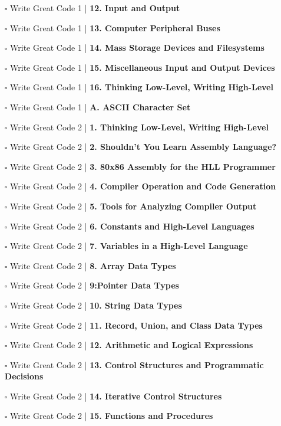 \documentclass[a4, landscape, 12pt]{article}
\newcommand{\checkbox}{$\square$}%
\begin{document}
\begin{itemize}
{}
\item [\checkbox]  Write Great Code 1 | \textbf{ 12. Input and Output
}
\item [\checkbox]  Write Great Code 1 | \textbf{ 13. Computer Peripheral Buses
}
\item [\checkbox]  Write Great Code 1 | \textbf{ 14. Mass Storage Devices and Filesystems
}
\item [\checkbox]  Write Great Code 1 | \textbf{ 15. Miscellaneous Input and Output Devices
}
\item [\checkbox]  Write Great Code 1 | \textbf{ 16. Thinking Low-Level, Writing High-Level
}
\item [\checkbox]  Write Great Code 1 | \textbf{ A. ASCII Character Set
}
\item [\checkbox]  Write Great Code 2 | \textbf{ 1. Thinking Low-Level, Writing High-Level
}
\item [\checkbox]  Write Great Code 2 | \textbf{ 2. Shouldn’t You Learn Assembly Language?
}
\item [\checkbox]  Write Great Code 2 | \textbf{ 3. 80x86 Assembly for the HLL Programmer
}
\item [\checkbox]  Write Great Code 2 | \textbf{ 4. Compiler Operation and Code Generation
}
\item [\checkbox]  Write Great Code 2 | \textbf{ 5. Tools for Analyzing Compiler Output
}
\item [\checkbox]  Write Great Code 2 | \textbf{ 6. Constants and High-Level Languages
}
\item [\checkbox]  Write Great Code 2 | \textbf{ 7. Variables in a High-Level Language
}
\item [\checkbox]  Write Great Code 2 | \textbf{ 8. Array Data Types
}
\item [\checkbox]  Write Great Code 2 | \textbf{ 9:Pointer Data Types
}
\item [\checkbox]  Write Great Code 2 | \textbf{ 10. String Data Types
}
\item [\checkbox]  Write Great Code 2 | \textbf{ 11. Record, Union, and Class Data Types
}
\item [\checkbox]  Write Great Code 2 | \textbf{ 12. Arithmetic and Logical Expressions
}
\item [\checkbox]  Write Great Code 2 | \textbf{ 13. Control Structures and Programmatic Decisions
}
\item [\checkbox]  Write Great Code 2 | \textbf{ 14. Iterative Control Structures
}
\item [\checkbox]  Write Great Code 2 | \textbf{ 15. Functions and Procedures
}
\end{itemize}
\end{document}
